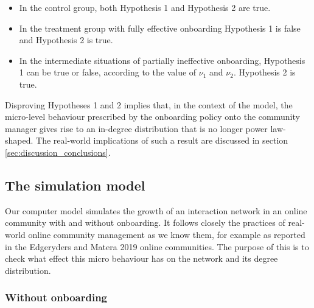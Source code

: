 \documentclass{bmcart}
\begin{document}
\begin{itemize}
\item In the control group, both Hypothesis 1 and Hypothesis 2 are true. 
\item In the treatment group with fully effective onboarding Hypothesis 1 is false and Hypothesis 2 is true. 
\item In the intermediate situations of partially ineffective onboarding, Hypothesis 1 can be true or false, according to the value of $\nu_1$ and $\nu_2$. Hypothesis 2 is true.
\end{itemize}

Disproving Hypotheses 1 and 2 implies that, in the context of the model, the micro-level behaviour prescribed by the onboarding policy onto the community manager gives rise to an in-degree distribution that is no longer power law-shaped. The real-world implications of such a result are discussed in section \ref{sec:discussion_conclusions}.

\subsection{The simulation model} \label{ssec:simulation_model}

Our computer model simulates the growth of an interaction network in an online community with and without onboarding. It follows closely the practices of real-world online community management as we know them, for example as reported in the Edgeryders and Matera 2019 online communities. The purpose of this is to check what effect this micro behaviour has on the network and its degree distribution.

\subsubsection{Without onboarding}
\end{document}
